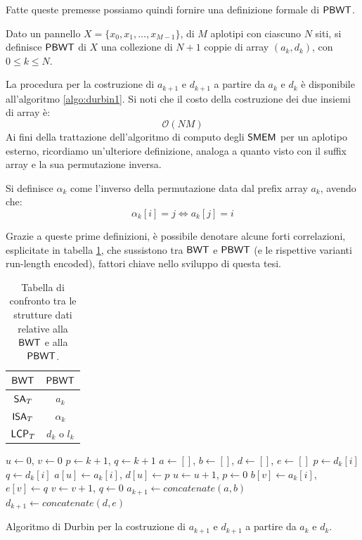 \noindent
Fatte queste premesse possiamo quindi fornire una definizione formale di
$\mbox{\rm {\sf PBWT}}$.
\begin{definizione}
  Dato un pannello $X=\{x_0,x_1,\ldots,x_{M-1}\}$, di $M$ aplotipi con ciascuno
  $N$ siti, si definisce $\mbox{\rm {\sf PBWT}}$ di $X$ una
  collezione di $N+1$ coppie di array $(a_k,d_k)$, con $0\leq k\leq N$.
\end{definizione}
La procedura per la costruzione di $a_{k+1}$ e $d_{k+1}$ a partire da $a_k$ e
$d_k$ è disponibile all'algoritmo \ref{algo:durbin1}. Si noti che
il costo della costruzione dei due insiemi di array è:
\begin{equation}
  \label{eq:pbwtadtime}
  \mathcal{O}(NM)
\end{equation}
Ai fini della trattazione dell'algoritmo di computo degli $\mbox{\rm {\sf SMEM}}$ per
un aplotipo esterno,
ricordiamo un'ulteriore definizione, analoga
a quanto visto con il suffix array e la sua permutazione inversa. 
\begin{definizione}
  Si definisce $\alpha_k$ come l'inverso della permutazione data dal
  prefix array $a_k$, avendo che:
  \[\alpha_k[i]=j \iff a_k[j]=i\]
\end{definizione}
Grazie a queste prime definizioni, è possibile denotare alcune forti
correlazioni, esplicitate in tabella \ref{tab:pbwtbwt}, che sussistono tra 
$\mbox{\rm {\sf BWT}}$ e $\mbox{\rm {\sf PBWT}}$ (e le rispettive varianti run-length
encoded), fattori chiave nello sviluppo di
questa tesi.
\begin{table}
  \centering
  \caption{Tabella di confronto tra le strutture dati relative alla $\mbox{\rm {\sf BWT}}$ e
    alla $\mbox{\rm {\sf PBWT}}$.}
  \label{tab:pbwtbwt}
  \begin{tabular}{c|c}
    $\mbox{\rm {\sf BWT}}$ & $\mbox{\rm {\sf PBWT}}$\\
    \hline
    $\mbox{\rm {\sf SA}}_T$ & $a_k$\\
    $\mbox{\rm {\sf ISA}}_T$ & $\alpha_k$\\
    $\mbox{\rm {\sf LCP}}_T$ & $d_k$ o $l_k$\\            
  \end{tabular}
  
\end{table}
\begin{algorithm}
  \small
  \begin{algorithmic}[1]
    \State $u\gets 0$, $v\gets 0$
    \State $p\gets k+1$, $q\gets k+1$
    \State $a\gets []$, $b\gets []$, $d\gets []$, $e\gets []$
    \State $p\gets d_k[i]$
    \EndIf
    \State $q\gets d_k[i]$
    \EndIf
    \State $a[u]\gets a_k[i]$, $d[u]\gets p$
    \State $u\gets u+1$, $p\gets 0$
    \Else
    \State $b[v]\gets a_k[i]$, $e[v]\gets q$
    \State $v\gets v+1$, $q\gets 0$
    \EndIf
    \EndFor
    \State $a_{k+1}\gets concatenate(a,b)$
    \State $d_{k+1}\gets concatenate(d,e)$ 
    \EndFunction
  \end{algorithmic}
  \caption{Algoritmo di Durbin per la costruzione di $a_{k+1}$ e $d_{k+1}$ a
  partire da $a_{k}$ e $d_{k}$.}
  \label{algo:durbin1}
\end{algorithm}
